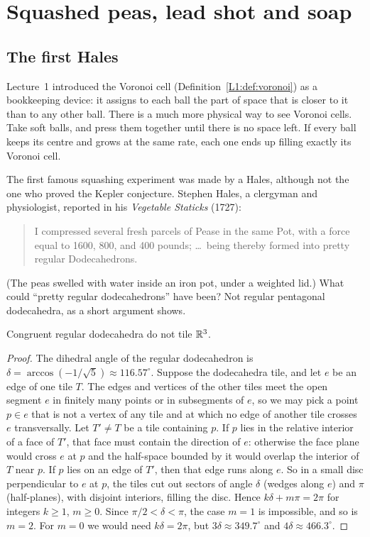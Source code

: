 \section{Squashed peas, lead shot and soap}
\label{PHYS:sec:squash}

\subsection*{The first Hales}
Lecture~1 introduced the Voronoi cell (Definition~\ref{L1:def:voronoi}) as a bookkeeping device: it
assigns to each ball the part of space that is closer to it than to any other ball. There is a much
more physical way to see Voronoi cells. Take soft balls, and press them together until there is no
space left. If every ball keeps its centre and grows at the same rate, each one ends up filling exactly
its Voronoi cell.

The first famous squashing experiment was made by a Hales, although not the one who proved the
Kepler conjecture. Stephen Hales, a clergyman and physiologist, reported in his \emph{Vegetable
Staticks} (1727):
\begin{quote}\small
I compressed several fresh parcels of Pease in the same Pot, with a force equal to 1600, 800, and 400
pounds; \dots\ being thereby formed into pretty regular Dodecahedrons.
\end{quote}
(The peas swelled with water inside an iron pot, under a weighted lid.) What could ``pretty regular
dodecahedrons'' have been? Not regular pentagonal dodecahedra, as a short argument shows.

\begin{proposition}\label{PHYS:prop:dodec}
Congruent regular dodecahedra do not tile $\mathbb{R}^3$.
\end{proposition}

\begin{proof}
The dihedral angle of the regular dodecahedron is $\delta=\arccos(-1/\sqrt5)\approx116.57^\circ$.
Suppose the dodecahedra tile, and let $e$ be an edge of one tile $T$. The edges and vertices of the
other tiles meet the open segment $e$ in finitely many points or in subsegments of $e$, so we may pick
a point $p\in e$ that is not a vertex of any tile and at which no edge of another tile crosses $e$
transversally. Let $T'\ne T$ be a tile containing $p$. If $p$ lies in the relative interior of a face
of $T'$, that face must contain the direction of $e$: otherwise the face plane would cross $e$ at $p$
and the half-space bounded by it would overlap the interior of $T$ near $p$. If $p$ lies on an edge of
$T'$, then that edge runs along $e$. So in a small disc perpendicular to $e$ at $p$, the tiles cut out
sectors of angle $\delta$ (wedges along $e$) and $\pi$ (half-planes), with disjoint interiors, filling
the disc. Hence $k\delta+m\pi=2\pi$ for integers $k\ge1$, $m\ge0$. Since $\pi/2<\delta<\pi$, the case
$m=1$ is impossible, and so is $m=2$. For $m=0$ we would need $k\delta=2\pi$, but
$3\delta\approx349.7^\circ$ and $4\delta\approx466.3^\circ$.
\end{proof}

